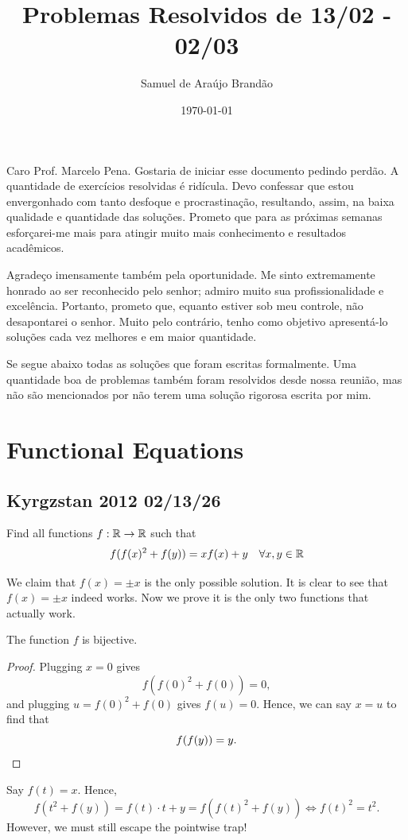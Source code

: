 \documentclass[12pt]{article}
\title{\sffamily\bfseries{Problemas Resolvidos de 13/02 - 02/03}}
\author{Samuel de Araújo Brandão}
\date{\today}
\begin{document}
\maketitle

Caro Prof. Marcelo Pena. Gostaria de iniciar esse documento pedindo perdão. A quantidade
de exercícios resolvidas é ridícula. Devo confessar que estou envergonhado com tanto desfoque e
procrastinação, resultando, assim, na baixa qualidade e quantidade das soluções. Prometo que para
as próximas semanas esforçarei-me mais para atingir muito mais conhecimento e resultados acadêmicos.

Agradeço imensamente também pela oportunidade. Me sinto extremamente honrado ao ser reconhecido
pelo senhor; admiro muito sua profissionalidade e excelência. Portanto, prometo que, equanto estiver sob
meu controle, não desapontarei o senhor. Muito pelo contrário, tenho como objetivo apresentá-lo
soluções cada vez melhores e em maior quantidade.

Se segue abaixo todas as soluções que foram escritas formalmente. Uma quantidade boa de problemas também
foram resolvidos desde nossa reunião, mas não são mencionados por não terem uma solução rigorosa escrita por mim.

\tableofcontents

\clearpage

\section{Functional Equations}
\subsection{Kyrgzstan 2012 02/13/26}
\begin{problem}
Find all functions $ f:\mathbb{R}\to\mathbb{R} $ such that
\[
	f(f(x)^2+f(y)) = xf(x)+y \quad \forall x,y\in \mathbb{R}
\]
\end{problem}
We claim that $f(x)=\pm x$ is the only possible solution. It is clear to see that $f(x)=\pm x$ indeed works.
Now we prove it is the only two functions that actually work.

\begin{claim}
	The function $f$ is bijective.
\end{claim}
\begin{proof}
	Plugging $x=0$ gives
	\[
		f(f(0)^2+f(0))=0,
	\]
	and plugging $u=f(0)^2+f(0)$ gives $f(u)=0$. Hence, we can say $x=u$ to find that
	\[
		f(f(y))=y. \qedhere
	\]
\end{proof}
Say $f(t)=x$. Hence,
\[
	f(t^2+f(y))=f(t)\cdot t + y= f(f(t)^2+f(y)) \iff f(t)^2=t^2.
\]
However, we must still escape the pointwise trap!
\end{document}

